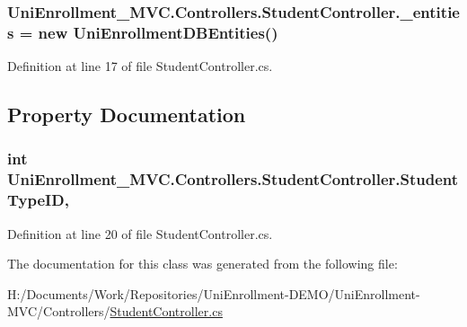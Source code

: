 \subsubsection[{\texorpdfstring{\+\_\+entities}{_entities}}]{ Uni\+Enrollment\+\_\+\+M\+V\+C.\+Controllers.\+Student\+Controller.\+\_\+entities = new {\bf Uni\+Enrollment\+D\+B\+Entities}()\hspace{0.3cm}{\ttfamily [private]}}\hypertarget{class_uni_enrollment___m_v_c_1_1_controllers_1_1_student_controller_a3cd73c0385c0990a8ed4f4d5652be10a}{}\label{class_uni_enrollment___m_v_c_1_1_controllers_1_1_student_controller_a3cd73c0385c0990a8ed4f4d5652be10a}


Definition at line 17 of file Student\+Controller.\+cs.



\subsection{Property Documentation}
\subsubsection[{\texorpdfstring{Student\+Type\+ID}{StudentTypeID}}]{\setlength{\rightskip}{0pt plus 5cm}int Uni\+Enrollment\+\_\+\+M\+V\+C.\+Controllers.\+Student\+Controller.\+Student\+Type\+ID\hspace{0.3cm}{\ttfamily [get]}, {\ttfamily [protected]}}\hypertarget{class_uni_enrollment___m_v_c_1_1_controllers_1_1_student_controller_ab8c62253a00233d37c8b799c7f3706b9}{}\label{class_uni_enrollment___m_v_c_1_1_controllers_1_1_student_controller_ab8c62253a00233d37c8b799c7f3706b9}


Definition at line 20 of file Student\+Controller.\+cs.



The documentation for this class was generated from the following file\+:\begin{DoxyCompactItemize}
\item 
H\+:/\+Documents/\+Work/\+Repositories/\+Uni\+Enrollment-\/\+D\+E\+M\+O/\+Uni\+Enrollment-\/\+M\+V\+C/\+Controllers/\hyperlink{_student_controller_8cs}{Student\+Controller.\+cs}\end{DoxyCompactItemize}
